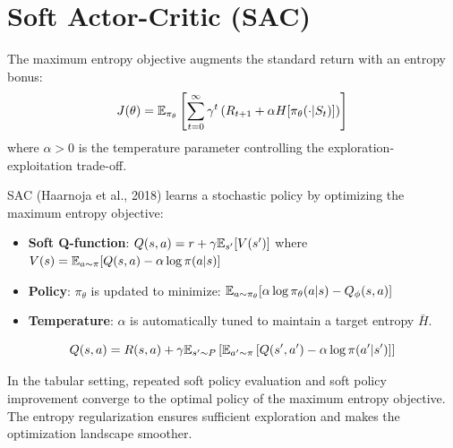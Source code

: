 \section{Soft Actor-Critic (SAC)}
\label{sec:sac}

\begin{definition}
The maximum entropy objective augments the standard return with an
entropy bonus:
\[
    J(\theta) = \mathbb{E}_{\pi_\theta}\left[\sum_{t=0}^{\infty} \gamma^t
    \left(R_{t+1} + \alpha H[\pi_\theta(\cdot | S_t)]\right)\right]
\]
where $\alpha > 0$ is the temperature parameter controlling the
exploration-exploitation trade-off.
\end{definition}

\begin{definition}
SAC (Haarnoja et al., 2018) learns a stochastic policy by optimizing
the maximum entropy objective:
\begin{itemize}
    \item \textbf{Soft Q-function}:
    $Q(s,a) = r + \gamma \mathbb{E}_{s'}[V(s')]$ where
    $V(s) = \mathbb{E}_{a \sim \pi}[Q(s,a) - \alpha \log \pi(a|s)]$
    \item \textbf{Policy}: $\pi_\theta$ is updated to minimize:
    $\mathbb{E}_{a \sim \pi_\theta}[\alpha \log \pi_\theta(a|s) - Q_\phi(s,a)]$
    \item \textbf{Temperature}: $\alpha$ is automatically tuned to
    maintain a target entropy $\bar{H}$.
\end{itemize}
\end{definition}

\begin{keyformulas}[title=\textbf{SAC Soft Bellman Equation}]
\[
    Q(s,a) = R(s,a) + \gamma \mathbb{E}_{s' \sim P}\left[
    \mathbb{E}_{a' \sim \pi}\left[Q(s', a') - \alpha \log \pi(a'|s')\right]
    \right]
\]
\end{keyformulas}

\begin{proposition}
In the tabular setting, repeated soft policy evaluation and soft policy
improvement converge to the optimal policy of the maximum entropy
objective. The entropy regularization ensures sufficient exploration
and makes the optimization landscape smoother.
\end{proposition}

